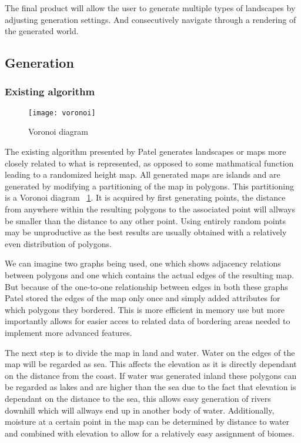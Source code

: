 The final product will allow the user to generate multiple types of landscapes by adjusting generation settings. And consecutively navigate through a rendering of the generated world. 

\subsection{Generation}

\subsubsection{Existing algorithm}

\begin{figure}[h]
	\centering
	\texttt{[image: voronoi]}
	\caption{Voronoi diagram}
	\label{fig:voronoi}
\end{figure}

The existing algorithm presented by Patel\cite{redblob} generates landscapes or maps more closely related to what is represented, as opposed to some mathmatical function leading to a randomized height map. All generated maps are islands and are generated by modifying a partitioning of the map in polygons. This partitioning is a Voronoi diagram ~\ref{fig:voronoi}. It is acquired by first generating points, the distance from anywhere within the resulting polygons to the associated point will allways be smaller than the distance to any other point. Using entirely random points may be unproductive as the best results are usually obtained with a relatively even distribution of polygons.

We can imagine two graphs being used, one which shows adjacency relations between polygons and one which contains the actual edges of the resulting map. But because of the one-to-one relationship between edges in both these graphs Patel\cite{redblob} stored the edges of the map only once and simply added attributes for which polygons they bordered. This is more efficient in memory use but more importantly allows for easier acces to related data of bordering areas needed to implement more advanced features.

The next step is to divide the map in land and water. Water on the edges of the map will be regarded as sea. This affects the elevation as it is directly dependant on the distance from the coast. If water was generated inland these polygons can be regarded as lakes and are higher than the sea due to the fact that elevation is dependant on the distance to the sea, this allows easy generation of rivers downhill which will allways end up in another body of water. Additionally, moisture at a certain point in the map can be determined by distance to water and combined with elevation to allow for a relatively easy assignment of biomes.

